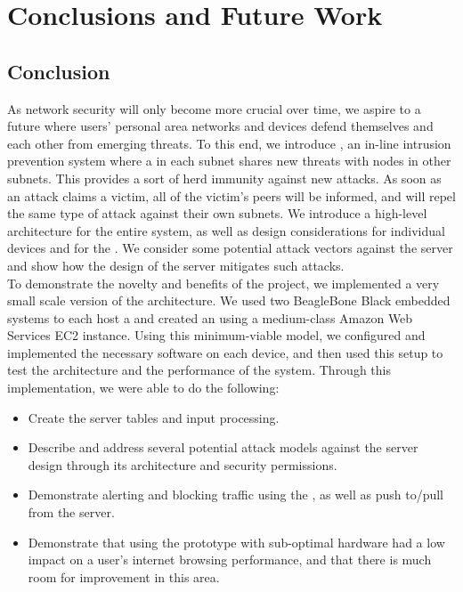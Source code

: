 \section{Conclusions and Future Work}
\label{sec:concl}

\subsection{Conclusion}
\label{sec:concl:main}
As network security will only become more crucial over time, we aspire to a future where users' personal area networks and devices defend themselves and each other from emerging threats. To this end, we introduce \sysname, an in-line intrusion prevention system where a \nodename in each subnet shares new threats with nodes in other subnets. This provides a sort of herd immunity against new attacks. As soon as an attack claims a victim, all of the victim's peers will be informed, and will repel the same type of attack against their own subnets. We introduce a high-level architecture for the entire system, as well as design considerations for individual devices and for the \servname. We consider some potential attack vectors against the server and show how the design of the server mitigates such attacks.  \\
To demonstrate the novelty and benefits of the project, we implemented a very small scale version of the architecture. We used two BeagleBone Black embedded systems to each host a \nodename and created an \sysname using a medium-class Amazon Web Services EC2 instance. Using this minimum-viable model, we configured and implemented the necessary software on each device, and then used this setup to test the architecture and the performance of the \sysname system. Through this implementation, we were able to do the following:

\begin{itemize}
    \item Create the \servname server tables and input processing.
    \item Describe and address several potential attack models against the \servname server design through its architecture and security permissions.
    \item Demonstrate alerting and blocking traffic using the \nodename, as well as push to/pull from the \servname server.
    \item Demonstrate that using the prototype \nodename with sub-optimal hardware had a low impact on a user's internet browsing performance, and that there is much room for improvement in this area.
\end{itemize}

